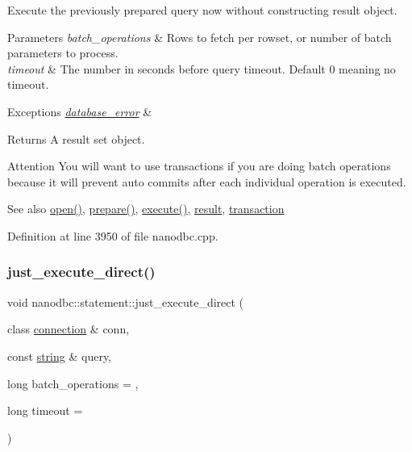 Execute the previously prepared query now without constructing result object. 


\begin{DoxyParams}{Parameters}
{\em batch\+\_\+operations} & Rows to fetch per rowset, or number of batch parameters to process. \\
\hline
{\em timeout} & The number in seconds before query timeout. Default 0 meaning no timeout. \\
\hline
\end{DoxyParams}

\begin{DoxyExceptions}{Exceptions}
{\em \mbox{\hyperlink{classnanodbc_1_1database__error}{database\+\_\+error}}} & \\
\hline
\end{DoxyExceptions}
\begin{DoxyReturn}{Returns}
A result set object. 
\end{DoxyReturn}
\begin{DoxyAttention}{Attention}
You will want to use transactions if you are doing batch operations because it will prevent auto commits after each individual operation is executed. 
\end{DoxyAttention}
\begin{DoxySeeAlso}{See also}
\mbox{\hyperlink{classnanodbc_1_1statement_a473ec2d726f6d8acc42ce0f5f6d1b967}{open()}}, \mbox{\hyperlink{classnanodbc_1_1statement_a63b56d30a303014ce8f80df5e5b67dca}{prepare()}}, \mbox{\hyperlink{classnanodbc_1_1statement_ab30dac3e4defd5a90181202e99ee8ca5}{execute()}}, \mbox{\hyperlink{classnanodbc_1_1result}{result}}, \mbox{\hyperlink{classnanodbc_1_1transaction}{transaction}} 
\end{DoxySeeAlso}


Definition at line 3950 of file nanodbc.\+cpp.

\mbox{\label{classnanodbc_1_1statement_a1e18b1014feb323c346683a331df7adb}} 
\subsubsection{\texorpdfstring{just\_execute\_direct()}{just\_execute\_direct()}}
{\footnotesize\ttfamily void nanodbc\+::statement\+::just\+\_\+execute\+\_\+direct (\begin{DoxyParamCaption}\item[{class \mbox{\hyperlink{classnanodbc_1_1connection}{connection}} \&}]{conn,  }\item[{const \mbox{\hyperlink{namespacenanodbc_abfc0ece56278e590911ec8352774c212}{string}} \&}]{query,  }\item[{long}]{batch\+\_\+operations = {},  }\item[{long}]{timeout = {} }\end{DoxyParamCaption})}



